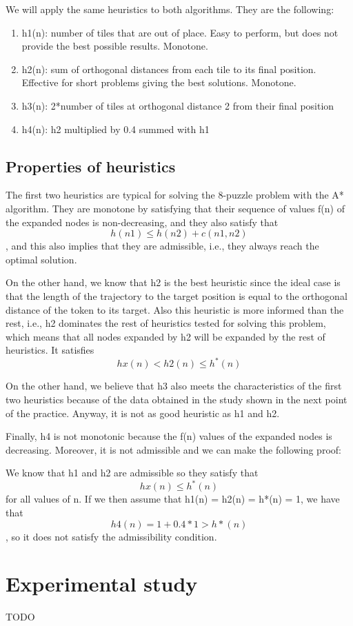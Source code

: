 \documentclass[runningheads]{llncs}
\begin{document}
We will apply the same heuristics to both algorithms. They are the following:
\begin{enumerate}
    \item h1(n): number of tiles that are out of place. Easy to perform, but does not provide the best possible results. Monotone.
    \item h2(n): sum of orthogonal distances from each tile to its final position. Effective for short problems giving the best solutions. Monotone.
    \item h3(n): 2*number of tiles at orthogonal distance 2 from their final position
    \item h4(n): h2 multiplied by 0.4 summed with h1
\end{enumerate}
\subsection{Properties of heuristics}
The first two heuristics are typical for solving the 8-puzzle problem with 
the A* algorithm. They are monotone by satisfying that their sequence of 
values f(n) of the expanded nodes is non-decreasing, and they also satisfy 
that $$h(n1) \leq h(n2) + c(n1,n2)$$, and this also implies that they are admissible, 
i.e., they always reach the optimal solution.

On the other hand, we know that h2 is the best heuristic since the ideal 
case is that the length of the trajectory to the target position is equal 
to the orthogonal distance of the token to its target. Also this heuristic 
is more informed than the rest, i.e., h2 dominates the rest of heuristics 
tested for solving this problem, which means that all nodes expanded by h2 
will be expanded by the rest of heuristics. It satisfies $$hx(n) < h2(n) \leq h^*(n)$$

On the other hand, we believe that h3 also meets the characteristics 
of the first two heuristics because of the data obtained in the study 
shown in the next point of the practice. Anyway, it is not as good heuristic as h1 and h2.

Finally, h4 is not monotonic because the f(n) values of the expanded 
nodes is decreasing. Moreover, it is not admissible and we can make 
the following proof:

We know that h1 and h2 are admissible so they satisfy that 
$$hx(n) \leq h^*(n)$$ for all values of n. If we then assume that 
h1(n) = h2(n) = h*(n) = 1, we have that $$h4(n) = 1 + 0.4*1 > h*(n)$$, 
so it does not satisfy the admissibility condition. 
\section{Experimental study}
TODO
\end{document}
